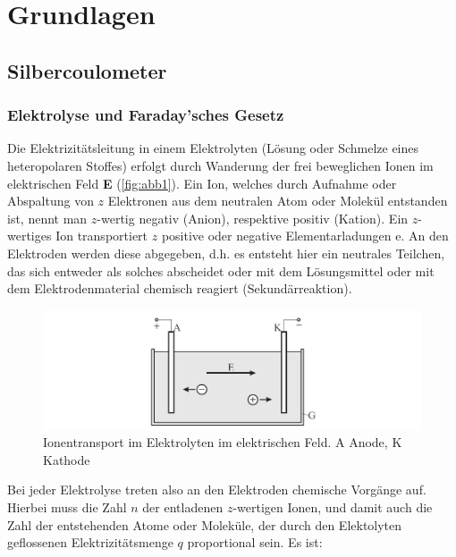 \documentclass[11pt,ngerman]{scrartcl}
\begin{document}
\section{Grundlagen}

\subsection{Silbercoulometer}

\subsubsection{Elektrolyse und Faraday'sches Gesetz}

Die Elektrizitätsleitung in einem Elektrolyten (Lösung oder Schmelze eines heteropolaren Stoffes)
erfolgt durch Wanderung der frei beweglichen Ionen im elektrischen Feld \textbf{E} (\autoref{fig:abb1}). Ein
Ion, welches durch Aufnahme oder Abspaltung von $z$ Elektronen aus dem neutralen Atom oder
Molekül entstanden ist, nennt man $z$-wertig negativ (Anion), respektive positiv (Kation). Ein
$z$-wertiges Ion transportiert $z$ positive oder negative Elementarladungen e. An den Elektroden
werden diese abgegeben, d.h. es entsteht hier ein neutrales Teilchen, das sich entweder als solches
abscheidet oder mit dem Lösungsmittel oder mit dem Elektrodenmaterial chemisch reagiert
(Sekundärreaktion).\cite{vorlagesilber}

\begin{figure}[H]
	\begin{center}
		\includegraphics[width=\textwidth]{abb1}
	\end{center}
	\caption{Ionentransport im Elektrolyten im elektrischen Feld. A Anode, K Kathode}
	\label{fig:abb1}
\end{figure}


Bei jeder Elektrolyse treten also an den Elektroden chemische Vorgänge auf. Hierbei muss die
Zahl $n$ der entladenen $z$-wertigen Ionen, und damit auch die Zahl der entstehenden Atome oder
Moleküle, der durch den Elektolyten geflossenen Elektrizitätsmenge $q$ proportional sein. Es ist:
\end{document}
